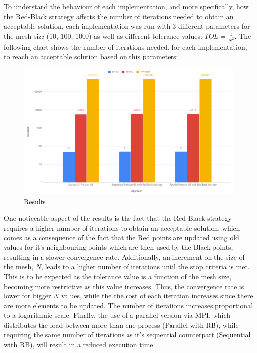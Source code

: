 \documentclass{article}
\begin{document}
To understand the behaviour of each implementation, and more specifically, how the Red-Black strategy affects the number of iterations needed
to obtain an acceptable solution, each implementation was run with 3 different parameters for the mesh size (10, 100, 1000) as well as different
tolerance values: $TOL=\frac{1}{N^2}$. The following chart shows the number of iterations needed, for each implementation, to reach an acceptable 
solution based on this parameters: 

\begin{figure}[H]
    \centering
    \includegraphics[width=16cm]{Pictures/Results.png}
    \caption{Results}
    \label{fig:results}
\end{figure}

One noticeable aspect of the results is the fact that the Red-Black strategy requires a higher number of iterations to obtain an acceptable solution,
which comes as a consequence of the fact that the Red points are updated using old values for it's neighbouring points which are then used by the Black
points, resulting in a slower convergence rate. Additionally, an increment on the size of the mesh, $N$, leads to a higher number of iterations until
the stop criteria is met. This is to be expected as the tolerance value is a function of the mesh size, becoming more restrictive as this value increases. 
Thus, the convergence rate is lower for bigger $N$ values, while the the cost of each iteration increases since there are more elements to be updated.
The number of iterations increases proportional to a logarithmic scale. 
Finally, the use of a parallel version via MPI, which distributes the load between more than one process (Parallel with RB), while requiring the same number
of iterations as it's sequential counterpart (Sequential with RB), will result in a reduced execution time.
\end{document}
